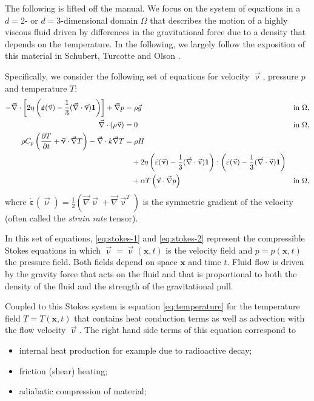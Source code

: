 The following is lifted off the \aspect manual.
We focus on the system of equations in a $d=2$- or $d=3$-dimensional
domain $\Omega$ that describes the motion of a highly viscous fluid driven
by differences in the gravitational force due to a density that depends on
the temperature. In the following, we largely follow the exposition of this
material in Schubert, Turcotte and Olson \cite{scto01}.

Specifically, we consider the following set of equations for velocity $\vec\upnu$, pressure $p$ and temperature $T$:
\begin{align}
  \label{eq:stokes-1}
  -\vec\nabla \cdot \left[2\eta \left(\dot{\bm \varepsilon}(\vec \upnu)
                                  - \frac{1}{3}(\vec\nabla \cdot \vec \upnu)\mathbf 1\right)
                \right] + \vec\nabla p &=
  \rho \vec g
  &
  & \textrm{in $\Omega$},
  \\
  \label{eq:stokes-2}
  \vec\nabla \cdot (\rho \vec \upnu) &= 0
  &
  & \textrm{in $\Omega$},
  \\
  \label{eq:temperature}
  \rho C_p \left(\frac{\partial T}{\partial t} + \vec \upnu\cdot\vec\nabla T\right)
  - \vec\nabla\cdot k\vec\nabla T
  &=
  \rho H
  \notag
  \\
  &\quad
  +
  2\eta
  \left(\dot\varepsilon(\vec\upnu) - \frac{1}{3}(\vec\nabla \cdot \vec \upnu)\mathbf 1\right)
  :
  \left(\dot\varepsilon(\vec\upnu) - \frac{1}{3}(\vec\nabla \cdot \vec \upnu)\mathbf 1\right)
  \\
  &\quad
  +\alpha T \left( \vec \upnu \cdot \vec\nabla p \right)
  && \textrm{in $\Omega$},
  \notag
\end{align}
where $\dot{\bm \varepsilon}(\vec\upnu) = \frac{1}{2}(\vec\nabla \vec\upnu + \vec\nabla \vec\upnu^T)$ 
is the symmetric gradient of the velocity (often called the
\textit{strain rate} tensor).

In this set of equations, \eqref{eq:stokes-1} and \eqref{eq:stokes-2}
represent the compressible Stokes equations in which $\vec\upnu =\vec\upnu (\mathbf x,t)$ 
is the velocity field and $p=p(\mathbf x,t)$ the pressure
field. Both fields depend on space $\mathbf x$ and time $t$. Fluid flow is
driven by the gravity force that acts on the fluid and that is proportional to
both the density of the fluid and the strength of the gravitational pull.

Coupled to this Stokes system is equation \eqref{eq:temperature} for the
temperature field $T=T(\mathbf x,t)$ that contains heat conduction terms as
well as advection with the flow velocity $\vec\upnu$. The right hand side
terms of this equation correspond to
\begin{itemize}
\item internal heat production for example due to radioactive decay;
\item friction (shear) heating;
\item adiabatic compression of material;
\end{itemize}

